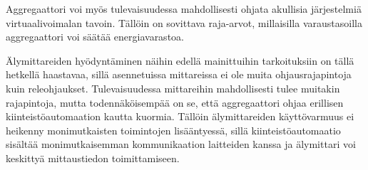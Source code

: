   Aggregaattori voi myös tulevaisuudessa mahdollisesti ohjata akullisia järjestelmiä virtuaalivoimalan tavoin. Tällöin on sovittava raja-arvot, millaisilla varaustasoilla aggregaattori voi säätää energiavarastoa. 
  
  Älymittareiden hyödyntäminen näihin edellä mainittuihin tarkoituksiin on tällä hetkellä haastavaa, sillä asennetuissa mittareissa ei ole muita ohjausrajapintoja kuin releohjaukset. Tulevaisuudessa mittareihin mahdollisesti tulee muitakin rajapintoja, mutta todennäköisempää on se, että aggregaattori ohjaa erillisen kiinteistöautomaation kautta kuormia. Tällöin älymittareiden käyttövarmuus ei heikenny monimutkaisten toimintojen lisääntyessä, sillä kiinteistöautomaatio sisältää monimutkaisemman kommunikaation laitteiden kanssa ja älymittari voi keskittyä mittaustiedon toimittamiseen.
